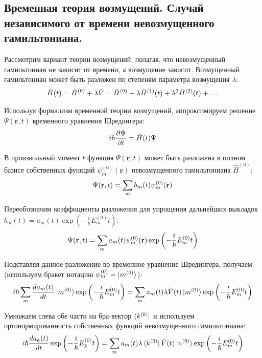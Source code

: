 \documentclass[12pt]{article}
\newcommand{\lb}{\left(}
\newcommand{\rb}{\right)}
\newcommand{\mf}{\mathbf}
\newcommand{\vverh}{\vspace*{-0.15cm}}
\begin{document}
\subsection*{Временная теория возмущений. Случай независимого от времени невозмущенного гамильтониана.}

Рассмотрим вариант теории возмущений, полагая, что невозмущенный гамильтониан не зависит от времени, а возмущение зависит. Возмущенный гамильтониан может быть разложен по степеням параметра возмущения $\lambda$:
\vverh
\begin{gather}
	\hat{H}(t) = \hat{H}^{(0)} + \lambda \hat{V} = \hat{H}^{(0)} + \lambda \hat{H}^{(1)}(t) + \lambda^2 \hat{H}^{(2)}(t) + \dots \notag
\end{gather}

Используя формализм временной теории возмущений, аппроксимируем решение $\Psi(\mf{r}, t)$ временного уравнения Шредингера:
\vverh
\begin{gather}
	i \hbar \frac{\partial \Psi}{\partial t} = \hat{H}(t) \Psi \notag
\end{gather}

В произвольный момент $t$ функция $\Psi(\mf{r}, t)$ может быть разложена в полном базисе собственных функций $\psi_m^{(0)}(\mf{r})$ невозмущенного гамильтониана $\hat{H}^{(0)}$:
\vverh
\begin{gather}
	\Psi(\mf{r}, t) = \sum_m b_m(t) \psi_m^{(0)}(\mf{r}) \notag
\end{gather}

Переобозначим коэффициенты разложения для упрощения дальнейших выкладок $b_m(t) = a_m(t) \exp \lb - \frac{i}{\hbar} E_m^{(0)} t \rb$:
\vverh \vverh \vverh
\begin{gather}
	\Psi(\mf{r}, t) = \sum_m a_m(t) \psi_m^{(0)} (\mf{r}) \exp \lb - \frac{i}{\hbar} E_m^{(0)} t \rb \notag
\end{gather}

Подставляя данное разложение во временное уравнение Шредингера, получаем (используем бракет нотацию $\psi_m^{(0)} = \ket{m^{(0)}}$):
\vverh
\begin{gather}
	i \hbar \sum_m \frac{d a_m(t)}{dt} \ket{m^{(0)}} \exp \lb - \frac{i}{\hbar} E_m^{(0)} t \rb = \sum_m a_m(t) \lambda \hat{V}(t) \ket{m^{(0)}} \exp \lb - \frac{i}{\hbar} E_m^{(0)} t \rb \notag  
\end{gather}

Умножаем слева обе части на бра-вектор $\bra{k^{(0)}}$ и используем ортонормированность собственных функций невозмущенного гамильтониана:  
\vverh
\begin{gather}
	i \hbar \frac{d a_k(t)}{dt} \exp \lb - \frac{i}{\hbar} E_k^{(0)} t \rb = \sum_m a_m(t) \lambda \bra {k^{(0)}} \hat{V}(t) \ket{n^{(0)}} \exp \lb - \frac{i}{\hbar} E_m^{(0)} t \rb \notag 
\end{gather}
\end{document}
